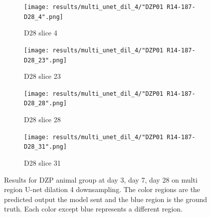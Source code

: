 \begin{figure}[!htb]
\medskip
\begin{subfigure}{0.25\textwidth}
  \texttt{[image: results/multi\_unet\_dil\_4/"DZP01 R14-187-D28\_4".png]}
  \caption{D28 slice 4}
\end{subfigure}\hfil %
\begin{subfigure}{0.25\textwidth}
  \texttt{[image: results/multi\_unet\_dil\_4/"DZP01 R14-187-D28\_23".png]}
  \caption{D28 slice 23}
\end{subfigure}\hfil %
\begin{subfigure}{0.25\textwidth}
  \texttt{[image: results/multi\_unet\_dil\_4/"DZP01 R14-187-D28\_28".png]}
  \caption{D28 slice 28}
\end{subfigure}\hfil %
\begin{subfigure}{0.25\textwidth}
  \texttt{[image: results/multi\_unet\_dil\_4/"DZP01 R14-187-D28\_31".png]}
  \caption{D28 slice 31}
\end{subfigure}
  
  \caption{Results for DZP animal group at day 3, day 7, day 28 on multi region U-net dilation 4 downsampling. The color regions are the predicted output the model sent and the blue region is the ground truth. Each color except blue represents a different region.}
  \label{fig:results_multi_unetdil4_DZP}
\end{figure}


